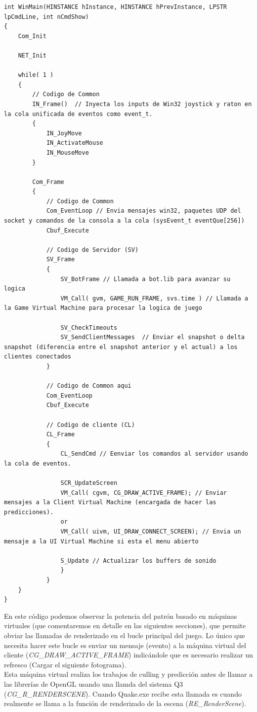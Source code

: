 \documentclass[a4paper,12pt]{report}
\begin{document}
	\begin{lstlisting}[style=C, numbers=none]
int WinMain(HINSTANCE hInstance, HINSTANCE hPrevInstance, LPSTR lpCmdLine, int nCmdShow)
{
	Com_Init
	
	NET_Init
	
	while( 1 )
	{
		// Codigo de Common 
		IN_Frame()  // Inyecta los inputs de Win32 joystick y raton en la cola unificada de eventos como event_t.
		{
			IN_JoyMove                                    
			IN_ActivateMouse
			IN_MouseMove
		}
		
		Com_Frame
		{
			// Codigo de Common 
			Com_EventLoop // Envia mensajes win32, paquetes UDP del socket y comandos de la consola a la cola (sysEvent_t eventQue[256]) 
			Cbuf_Execute
			
			// Codigo de Servidor (SV)
			SV_Frame
			{
				SV_BotFrame // Llamada a bot.lib para avanzar su logica
				VM_Call( gvm, GAME_RUN_FRAME, svs.time ) // Llamada a la Game Virtual Machine para procesar la logica de juego
				
				SV_CheckTimeouts
				SV_SendClientMessages  // Enviar el snapshot o delta snapshot (diferencia entre el snapshot anterior y el actual) a los clientes conectados
			} 
		
			// Codigo de Common aqui
			Com_EventLoop
			Cbuf_Execute
			
			// Codigo de cliente (CL)
			CL_Frame
			{
				CL_SendCmd // Eenviar los comandos al servidor usando la cola de eventos.
				
				SCR_UpdateScreen
				VM_Call( cgvm, CG_DRAW_ACTIVE_FRAME); // Enviar mensajes a la Client Virtual Machine (encargada de hacer las predicciones).
				or
				VM_Call( uivm, UI_DRAW_CONNECT_SCREEN); // Envia un mensaje a la UI Virtual Machine si esta el menu abierto
				
				S_Update // Actualizar los buffers de sonido
				}
			}	
	}
}
	\end{lstlisting}

    En este código podemos observar la potencia del patrón basado en máquinas virtuales (que comentaremos en detalle en las siguientes secciones), que permite obviar las llamadas de renderizado en el bucle principal del juego. Lo único que necesita hacer este bucle es enviar un mensaje (evento) a la máquina virtual del cliente (\textit{CG\_DRAW\_ACTIVE\_FRAME}) indicándole que es necesario realizar un refresco (Cargar el siguiente fotograma).\\
    
    Esta máquina virtual realiza los trabajos de culling y predicción antes de llamar a las librerías de OpenGL usando una llamda del sistema Q3 (\textit{CG\_R\_RENDERSCENE}). Cuando Quake.exe recibe esta llamada es cuando realmente se llama a la función de renderizado de la escena (\textit{RE\_RenderScene}). \cite{unrolled_loop}\\   
    
\end{document}
